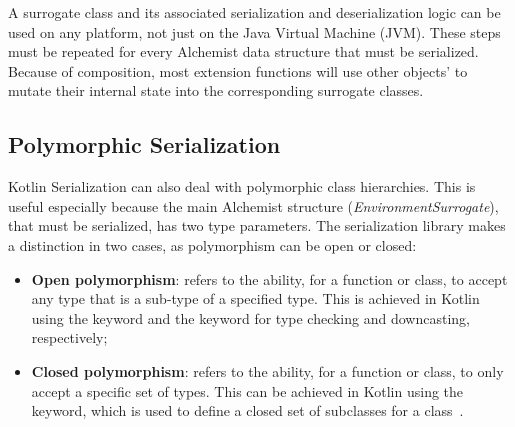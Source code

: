 



A surrogate class and its associated serialization and deserialization logic can be used on any platform, not just on the Java Virtual Machine (JVM). These steps must be repeated for every Alchemist data structure that must be serialized. Because of composition, most extension functions will use other objects'  to mutate their internal state into the corresponding surrogate classes.
\subsection{Polymorphic Serialization}
\label{ssec:polymorphic-serialization}
Kotlin Serialization can also deal with polymorphic class hierarchies. This is useful especially because the main Alchemist structure (\textit{EnvironmentSurrogate}), that must be serialized, has two type parameters. The serialization library makes a distinction in two cases, as  polymorphism can be open or closed:
\begin{itemize}
	\item \textbf{Open polymorphism}: refers to the ability, for a function or class, to accept any type that is a sub-type of a specified type. This is achieved in Kotlin using the  keyword and the  keyword for type checking and downcasting, respectively;
	\item \textbf{Closed polymorphism}: refers to the ability, for a function or class, to only accept a specific set of types. This can be achieved in Kotlin using the  keyword, which is used to define a closed set of subclasses for a class~\cite{kotlinxs84:online}.
\end{itemize}

